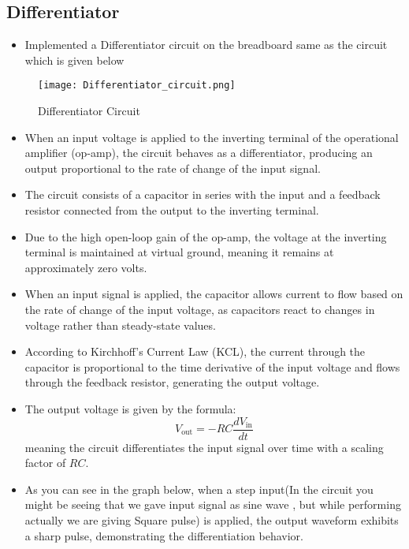 \documentclass[9pt,conference]{IEEEtran}
\begin{document}
\subsection{Differentiator}
\begin{itemize}
    \item Implemented a Differentiator circuit on the breadboard same as the circuit which is given below
\end{itemize}
\begin{figure}[H]
    \centering
    \texttt{[image: Differentiator\_circuit.png]}
    \caption{Differentiator Circuit}
    \label{fig:clamper_circuit}
\end{figure}

\begin{itemize}
    \item When an input voltage is applied to the inverting terminal of the operational amplifier (op-amp), the circuit behaves as a differentiator, producing an output proportional to the rate of change of the input signal.
    \item The circuit consists of a capacitor in series with the input and a feedback resistor connected from the output to the inverting terminal.
    \item Due to the high open-loop gain of the op-amp, the voltage at the inverting terminal is maintained at virtual ground, meaning it remains at approximately zero volts.
    \item When an input signal is applied, the capacitor allows current to flow based on the rate of change of the input voltage, as capacitors react to changes in voltage rather than steady-state values.
    \item According to Kirchhoff’s Current Law (KCL), the current through the capacitor is proportional to the time derivative of the input voltage and flows through the feedback resistor, generating the output voltage.
    \item The output voltage is given by the formula:  
      \[
      V_{\text{out}} = -RC \frac{dV_{\text{in}}}{dt}
      \]
      meaning the circuit differentiates the input signal over time with a scaling factor of \( RC \).
    \item As you can see in the graph below, when a step input(In the circuit you might be seeing that we gave input signal as sine wave , but while performing actually we are giving Square pulse) is applied, the output waveform exhibits a sharp pulse, demonstrating the differentiation behavior.
\end{itemize}
\end{document}
